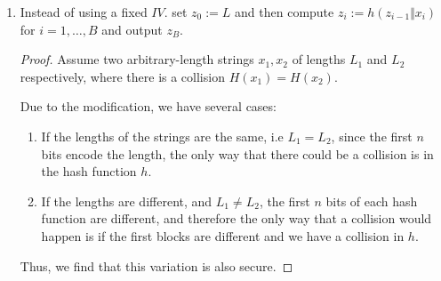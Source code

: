 \documentclass{article}
\begin{document}
\begin{enumerate}
\begin{enumerate}
      \item Instead of using a fixed $IV$. set $z_0 := L$ and then compute $z_i
        := h(z_{i - 1} \Vert x_i)$ for $i = 1, \dots, B$ and output $z_B$.

        \begin{proof}
          Assume two arbitrary-length strings $x_1, x_2$ of lengths $L_1$ and
          $L_2$ respectively, where there is a collision $H(x_1) = H(x_2)$.

          Due to the modification, we have several cases:
          \begin{enumerate}
            \item If the lengths of the strings are the same, i.e $L_1 = L_2$, 
              since the first $n$ bits encode the length, the only way that
              there could be a collision is in the hash function $h$.
            \item If the lengths are different, and $L_1 \neq L_2$, the first
              $n$ bits of each hash function are different, and therefore the
              only way that a collision would happen is if the first blocks are
              different and we have a collision in $h$.
          \end{enumerate}

          Thus, we find that this variation is also secure.
        \end{proof}

    \end{enumerate}
\end{enumerate}
\end{document}
